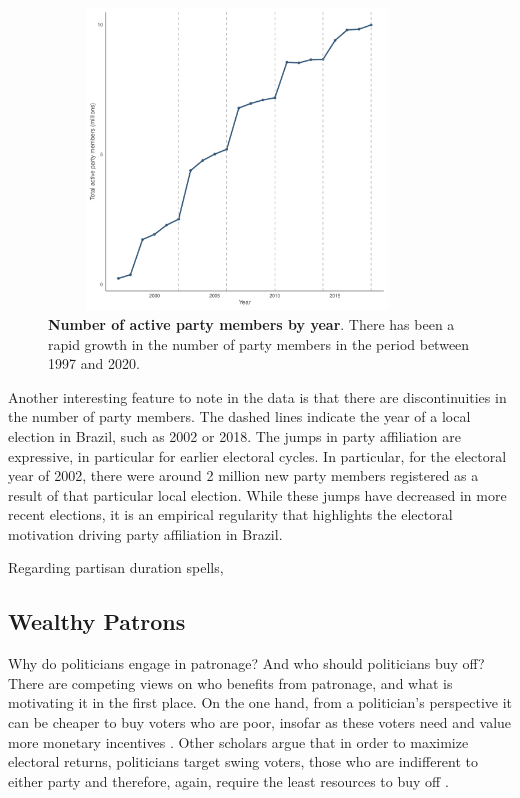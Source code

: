 \documentclass[12pt,a4paper]{article}
\begin{document}
\begin{figure}[H]
    \centering
    \includegraphics[width = 10cm, height = 8cm]{figures/partisanship/plot_partisan_by_year.pdf}
    \caption{\textbf{Number of active party members by year}. There has been a rapid growth in the number of party members in the period between 1997 and 2020.}
    \label{fig:map_pooled}
\end{figure}

Another interesting feature to note in the data is that there are discontinuities in the number of party members. The dashed lines indicate the year of a local election in Brazil, such as 2002 or 2018. The jumps in party affiliation are expressive, in particular for earlier electoral cycles. In particular, for the electoral year of 2002, there were around 2 million new party members registered as a result of that particular local election. While these jumps have decreased in more recent elections, it is an empirical regularity that highlights the electoral motivation driving party affiliation in Brazil.

Regarding partisan duration spells, 



\subsection{Wealthy Patrons}

Why do politicians engage in patronage? And who should politicians buy off? There are competing views on who benefits from patronage, and what is motivating it in the first place. On the one hand, from a politician's perspective it can be cheaper to buy voters who are poor, insofar as these voters need and value more monetary incentives \citet{stokes2013brokers}. Other scholars argue that in order to maximize electoral returns, politicians target swing voters, those who are indifferent to either party and therefore, again, require the least resources to buy off \citet{dixit1996determinants}.
\end{document}

